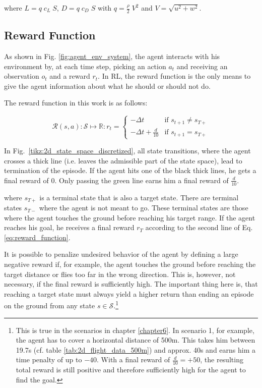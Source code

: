 where $L = q \; c_L \; S$, $D = q \; c_D \; S$ with $q = \frac{\rho}{2}\; V^2$ and $V=\sqrt{u^2+w^2}$.

\subsection{Reward Function}
\label{sec:reward-function}

As shown in Fig. \ref{fig:agent_env_system}, the agent interacts with his environment by, at each time step, picking an action $a_t$ and receiving an observation $o_t$ and a reward $r_t$. In RL, the reward function is the only means to give the agent information about what he should or should not do.

The reward function in this work is as follows:

\begin{equation}
\mathcal{R}(s,a): \mathcal{S} \mapsto \mathbb{R}: r_t =
\begin{cases}
-\Delta t & \text{if } s_{t+1} \neq s_{T+}\\
-\Delta t + \frac{d}{10} & \text{if } s_{t+1} = s_{T+}
\end{cases}
\label{eq:reward_function}
\end{equation}

In Fig.~\ref{tikz:2d_state_space_discretized}, all state transitions, where the agent crosses a thick line (i.e. leaves the admissible part of the state space), lead to termination of the episode. If the agent hits one of the black thick lines, he gets a final reward of $0$. Only passing the green line earns him a final reward of $\frac{d}{10}$.

where $s_{T+}$ is a terminal state that is also a target state. There are terminal states $s_{T-}$ where the agent is not meant to go. These terminal states are those where the agent touches the ground before reaching his target range. If the agent reaches his goal, he receives a final reward $r_T$ according to the second line of Eq. \ref{eq:reward_function}. 

It is possible to penalize undesired behavior of the agent by defining a large negative reward if, for example, the agent touches the ground before reaching the target distance or flies too far in the wrong direction. This is, however, not necessary, if the final reward is sufficiently high. The important thing here is, that reaching a target state must always yield a higher return than ending an episode on the ground from any state $s \in \mathcal{S}$.\footnote{This is true in the scenarios in chapter \ref{chapter6}. In scenario 1, for example, the agent has to cover a horizontal distance of 500m. This takes him between 19.7s (cf. table \ref{tab:2d_flight_data_500m}) and approx. 40s and earns him a time penalty of up to $-40$. With a final reward of $\frac{d}{10}=+50$, the resulting total reward is still positive and therefore sufficiently high for the agent to find the goal.}

